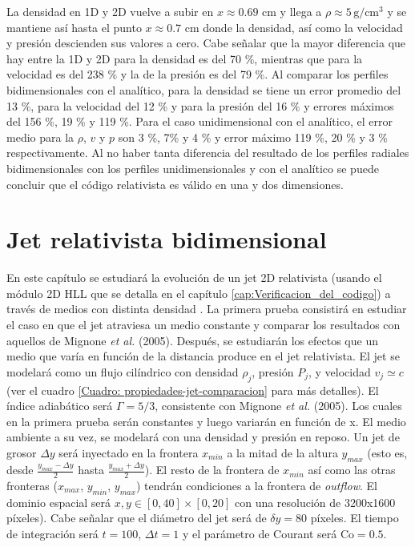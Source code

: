 \documentclass[12pt,a4paper]{book}
\begin{document}
La densidad en 1D y 2D vuelve a subir
en $x \approx 0.69$ cm y llega a $\rho \approx 5 \,  \text{g}/ \text{cm}^3$ y 
se mantiene así hasta el punto $x \approx 0.7$ cm 
donde la densidad, así como la velocidad y presión descienden sus valores a cero.
Cabe señalar que la mayor diferencia que hay entre la 1D y 2D para la densidad es del 70 \%, mientras que para la 
velocidad es del 238 \% y la de la presión es del 79 \%.
Al comparar los perfiles bidimensionales con el analítico, para la densidad se tiene un error promedio del
13 \%, para la velocidad del 12 \% y para la presión del 16 \% y errores máximos del 156 \%, 19 \% y 119 \%. 
Para el caso unidimensional con el analítico, el error medio para la $\rho$, $v$ y $p$ son 
3 \%,  7\% y  4 \% y error máximo 119 \%, 20 \% y 3 \% respectivamente.
Al no haber tanta diferencia del resultado de los perfiles radiales bidimensionales con 
los perfiles unidimensionales y con el analítico se puede concluir que el código relativista es válido
en una y dos dimensiones.





\chapter{Jet relativista bidimensional}

En este capítulo se estudiará la evolución de un jet 2D relativista (usando el módulo 2D HLL que se detalla en el capítulo \ref{cap:Verificacion_del_codigo}) a través de medios con distinta densidad . 
La primera prueba consistirá en estudiar el caso en que el jet atraviesa un 
medio constante y  comparar los resultados con aquellos de Mignone \emph{et al.} (2005). 
Después, se estudiarán los efectos que un medio que varía en función de la distancia produce en el jet relativista.
El jet se modelará como un flujo cilíndrico con densidad $\rho_j$, presión $P_j$,  y velocidad $v_j \simeq c$ 
(ver el cuadro \ref{Cuadro: propiedades-jet-comparacion} para más detalles). El índice adiabático será $\Gamma = 5/3$, 
consistente con Mignone \emph{et al.} (2005). 
Los cuales en la primera prueba serán constantes y luego variarán en función de x. El medio ambiente a su vez, 
se modelará con una densidad y presión {\color{red} en reposo}. Un jet de grosor $\Delta y$ será inyectado 
en la frontera $x_{min}$ a la mitad de la altura $y_{max}$ (esto es, desde {\color{red} $\frac{y_{max}-\Delta y}{2}$ hasta 
$\frac{y_{max}+ \Delta y}{2}$)}. 
El resto de la frontera de $x_{min}$ así como las otras fronteras ($x_{max}$, $y_{min}$, $y_{max}$) tendrán condiciones a la
frontera de \emph{outflow}. 
El dominio espacial será $x, y \in [0,40]\times[0,20]$ con una resolución de 3200x1600 píxeles). 
Cabe señalar que el diámetro del jet será de $\delta y=80$ píxeles. El tiempo de integración será $t = 100$, 
{ \color{red}$\Delta t = 1$}  y el parámetro de Courant será $\text{Co} = 0.5$.
\end{document}

